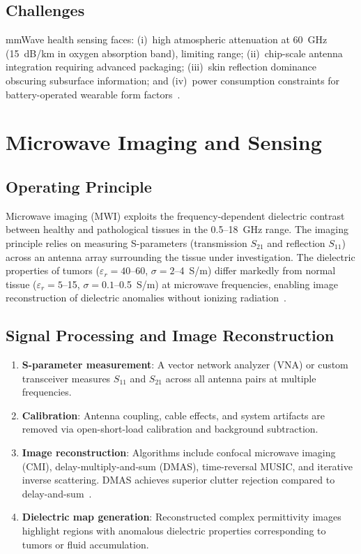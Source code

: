 \documentclass[journal,twoside]{IEEEtran}
\begin{document}
\subsection{Challenges}
mmWave health sensing faces: (i)~high atmospheric attenuation at 60~GHz (15~dB/km in oxygen absorption band), limiting range; (ii)~chip-scale antenna integration requiring advanced packaging; (iii)~skin reflection dominance obscuring subsurface information; and (iv)~power consumption constraints for battery-operated wearable form factors~\cite{ref_mmwave_challenge2024}.

\section{Microwave Imaging and Sensing}

\subsection{Operating Principle}
Microwave imaging (MWI) exploits the frequency-dependent dielectric contrast between healthy and pathological tissues in the 0.5--18~GHz range. The imaging principle relies on measuring S-parameters (transmission $S_{21}$ and reflection $S_{11}$) across an antenna array surrounding the tissue under investigation. The dielectric properties of tumors ($\varepsilon_r = 40$--60, $\sigma = 2$--4~S/m) differ markedly from normal tissue ($\varepsilon_r = 5$--15, $\sigma = 0.1$--0.5~S/m) at microwave frequencies, enabling image reconstruction of dielectric anomalies without ionizing radiation~\cite{ref_mwi_principle2024}.

\subsection{Signal Processing and Image Reconstruction}
\begin{enumerate}
\item \textbf{S-parameter measurement}: A vector network analyzer (VNA) or custom transceiver measures $S_{11}$ and $S_{21}$ across all antenna pairs at multiple frequencies.
\item \textbf{Calibration}: Antenna coupling, cable effects, and system artifacts are removed via open-short-load calibration and background subtraction.
\item \textbf{Image reconstruction}: Algorithms include confocal microwave imaging (CMI), delay-multiply-and-sum (DMAS), time-reversal MUSIC, and iterative inverse scattering. DMAS achieves superior clutter rejection compared to delay-and-sum~\cite{ref_dmas_mwi2024}.
\item \textbf{Dielectric map generation}: Reconstructed complex permittivity images highlight regions with anomalous dielectric properties corresponding to tumors or fluid accumulation.
\end{enumerate}
\end{document}
